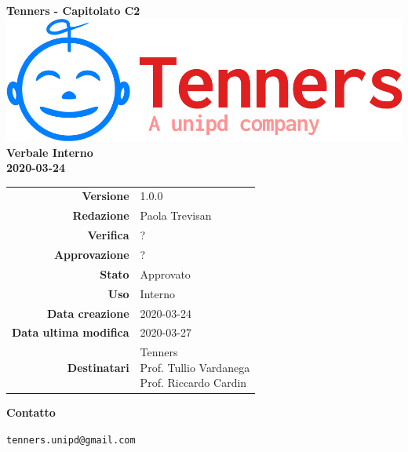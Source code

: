 \begin{titlepage}
	\begin{center}
		\large \textbf{Tenners - Capitolato C2}
		\vfill
		\includegraphics[scale = 0.3]{./res/img/logo.png}\\
		\vfill
		\Huge \textbf{Verbale Interno} \\
		\textbf {2020-03-24}
		
		\vfill
		\large
		
		\begin{tabular}{r|l}
			\textbf{Versione} & 1.0.0 \\
			\textbf{Redazione} & Paola Trevisan \\
			\textbf{Verifica} &  ? \\
			\textbf{Approvazione} & ? \\
			\textbf{Stato} & Approvato \\
			\textbf{Uso} & Interno\\
			\textbf{Data creazione} &  2020-03-24\\
			\textbf{Data ultima modifica} & 2020-03-27 \\
			\textbf{Destinatari} & \parbox[t]{5cm}{Tenners \\ Prof. Tullio Vardanega\\ Prof. Riccardo Cardin}
		\end{tabular}
		\vfill
		\normalsize
		\vfill
		\textbf{Contatto}
		
		\texttt{tenners.unipd@gmail.com}
		
	\end{center}
\end{titlepage}